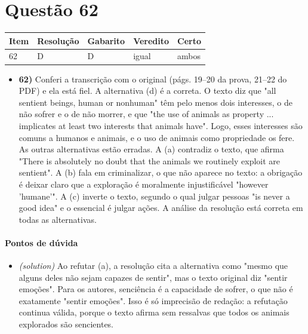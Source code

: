 \documentclass{article}%
\begin{document}
\section*{Questão 62}%
\begin{longtable}{@{}p{} p{} p{} p{} p{}@{}}\toprule Item & Resolução & Gabarito & Veredito & Certo \\ \midrule
62 & D & D & igual & ambos \\
\bottomrule\end{longtable}%
\begin{itemize}%
\item%
\textbf{62)} Conferi a transcrição com o original (págs. 19--20 da prova, 21--22 do PDF) e ela está fiel. A alternativa (d) é a correta. O texto diz que "all sentient beings, human or nonhuman" têm pelo menos dois interesses, o de não sofrer e o de não morrer, e que "the use of animals as property ... implicates at least two interests that animals have". Logo, esses interesses são comuns a humanos e animais, e o uso de animais como propriedade os fere. As outras alternativas estão erradas. A (a) contradiz o texto, que afirma "There is absolutely no doubt that the animals we routinely exploit are sentient". A (b) fala em criminalizar, o que não aparece no texto: a obrigação é deixar claro que a exploração é moralmente injustificável "however 'humane'". A (c) inverte o texto, segundo o qual julgar pessoas "is never a good idea" e o essencial é julgar ações. A análise da resolução está correta em todas as alternativas.%
\end{itemize}%
\paragraph{Pontos de dúvida}%
\begin{itemize}%
\item%
\textit{(solution)} Ao refutar (a), a resolução cita a alternativa como "mesmo que alguns deles não sejam capazes de sentir", mas o texto original diz "sentir emoções". Para os autores, senciência é a capacidade de sofrer, o que não é exatamente "sentir emoções". Isso é só imprecisão de redação: a refutação continua válida, porque o texto afirma sem ressalvas que todos os animais explorados são sencientes.%
\end{itemize}%
\end{document}
